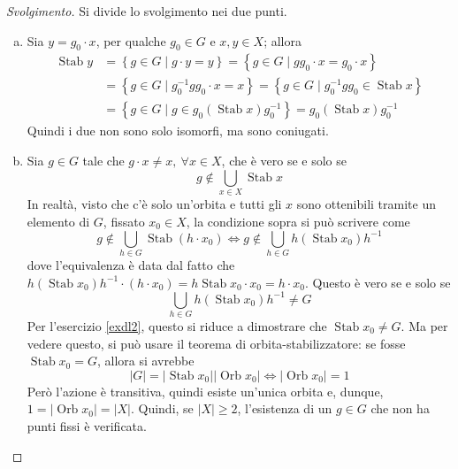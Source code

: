 \documentclass[11pt]{article}
\theoremstyle{style}
\newenvironment{svolgimento}{\renewcommand\qedsymbol{$\blacksquare$}\begin{proof}[Svolgimento]}{\end{proof}}
\numberwithin{equation}{subsection}
\begin{document}
\begin{svolgimento}
	Si divide lo svolgimento nei due punti.
	\begin{enumerate}[(a).]
		\item Sia $y = g_0\cdot x$, per qualche $g_0 \in G$ e $x,y \in X$; allora 
			\[
			\begin{split}
				\operatorname{Stab} y &= \left\{ g\in G  \mid g \cdot y= y  \right\} = \left\{ g\in G \mid gg_0 \cdot x = g_0 \cdot x \right\} \\
						      &= \left\{ g \in G  \mid g_0^{-1}g g_0 \cdot x =x \right\} = \left\{ g \in G  \mid g_0^{-1}g g_0 \in \operatorname{Stab} x \right\} \\
						      &= \left\{ g \in G  \mid g \in g_0 (\operatorname{Stab} x) g_0^{-1} \right\} = g_0 (\operatorname{Stab} x) g_0^{-1}
			\end{split}
			\] 
			Quindi i due non sono solo isomorfi, ma sono coniugati.
		\item Sia $g \in G$ tale che $g\cdot x \neq x, \ \forall x \in X$, che \`e vero se e solo se
			\[
			g \not \in \bigcup_{x \in X} \operatorname{Stab} x
			\] 
			In realt\`a, visto che c'\`e solo un'orbita e tutti gli $x$ sono ottenibili tramite un elemento di $G$, fissato $x_0 \in X$, la condizione sopra si pu\`o scrivere come
			\[
			g\not \in \bigcup_{h \in G} \operatorname{Stab} (h\cdot x_0) \iff g \not \in \bigcup_{h \in G} h(\operatorname{Stab} x_0)h^{-1}
			\] 
			dove l'equivalenza \`e data dal fatto che $h(\operatorname{Stab} x_0)h^{-1} \cdot (h\cdot x_0) = h \operatorname{Stab} x_0 \cdot x_0 = h \cdot x_0$.
			Questo \`e vero se e solo se 
			\[
			\bigcup_{h \in G} h(\operatorname{Stab} x_0) h^{-1}\neq G
			\] 
			Per l'esercizio \ref{exdl2}, questo si riduce a dimostrare che $\operatorname{Stab} x_0 \neq G$.
			Ma per vedere questo, si pu\`o usare il teorema di orbita-stabilizzatore: se fosse $\operatorname{Stab} x_0 = G$, allora si avrebbe
			\[
			\lvert G \rvert  = \lvert \operatorname{Stab} x_0 \rvert \lvert \operatorname{Orb} x_0 \rvert \iff \lvert \operatorname{Orb} x_0 \rvert =1
			\] 
			Per\`o l'azione \`e transitiva, quindi esiste un'unica orbita e, dunque, $1=\lvert \operatorname{Orb} x_0 \rvert  = \lvert X \rvert $.
			Quindi, se $\lvert X \rvert  \ge 2$, l'esistenza di un $g \in G$ che non ha punti fissi \`e verificata.
	\end{enumerate}
\end{svolgimento}
\end{document}
